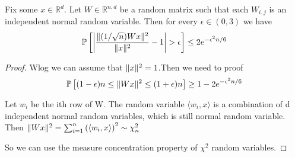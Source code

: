 \begin{lemma}
    Fix some $ x \in \mathbb{R}^{d} $. Let $ W \in \mathbb{R}^{n,d} $ be a random matrix such that each $ W_{i,j} $ is an independent normal random variable. Then for every $ \epsilon \in (0, 3) $ we have
    \[
        \mathbb{P}\left[ \left| \frac{ \Arrowvert (1/\sqrt n) W x \Arrowvert^2 }{ \Arrowvert x \Arrowvert^2 } - 1 \right| > \epsilon \right] \le 2 e^{-\epsilon^2 n/6}
    \]
    \begin{proof}
        Wlog we can assume that $ \Arrowvert x \Arrowvert^2 = 1 $.Then we need to proof
        \[
            \mathbb{P}\left[ (1 - \epsilon) n \le \Arrowvert W x \Arrowvert^2 \le (1+\epsilon)n \right] \ge 1 - 2 e^{-\epsilon^2 n / 6}
        \]

        Let $ w_i $ be the ith row of W. The random variable $ \langle w_i, x \rangle $ is a combination of d independent normal random variables, which is still normal random variable.
        Then $ \Arrowvert W x \Arrowvert^2 = \sum^{n}_{i=1} {\left( \langle w_i, x \rangle \right)}^2 \sim \chi^2_n$

        So we can use the measure concentration property of $ \chi^2 $ random variables.
    \end{proof}
\end{lemma}

